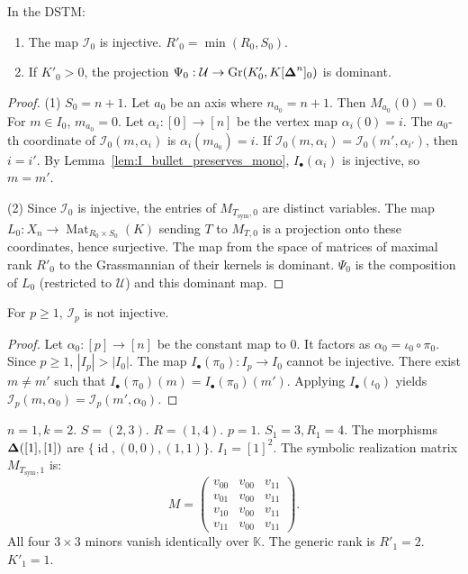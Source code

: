 \begin{theorem}[Injectivity and Dominance at $p=0$]\label{thm:index_collision_injectivity}
In the DSTM:
\begin{enumerate}
    \item The map $\mathcal{I}_0$ is injective. $R'_0 = \min(R_0, S_0)$.
    \item If $K'_0>0$, the projection
          $\Psi_0: \mathcal{U} \to \operatorname{Gr}(K'_0, K[\boldsymbol{\Delta}^n]_0)$ is dominant.
\end{enumerate}
\end{theorem}
\begin{proof}
(1) $S_0=n+1$. Let $a_0$ be an axis where $n_{a_0}=n+1$. Then $M_{a_0}(0)=0$.
For $m \in I_0$, $m_{a_0}=0$. Let $\alpha_i:[0]\to[n]$ be the vertex map
$\alpha_i(0)=i$. The $a_0$-th coordinate of $\mathcal{I}_0(m, \alpha_i)$ is
$\alpha_i(m_{a_0}) = i$. If
$\mathcal{I}_0(m, \alpha_i) = \mathcal{I}_0(m', \alpha_{i'})$, then
$i=i'$. By Lemma~\ref{lem:I_bullet_preserves_mono}, $I_\bullet(\alpha_i)$
is injective, so $m=m'$.

(2) Since $\mathcal{I}_0$ is injective, the entries of $M_{T_{\mathrm{sym}},0}$
are distinct variables. The map
$L_0: X_n \to \operatorname{Mat}_{R_0\times S_0}(K)$ sending $T$ to
$M_{T,0}$ is a projection onto these coordinates, hence surjective. The
map from the space of matrices of maximal rank $R'_0$ to the Grassmannian
of their kernels is dominant. $\Psi_0$ is the composition of $L_0$
(restricted to $\mathcal{U}$) and this dominant map.
\end{proof}

\begin{lemma}\label{lem:noninj-all-p>0}
For $p\ge 1$, $\mathcal{I}_p$ is not injective.
\end{lemma}
\begin{proof}
Let $\alpha_0:[p]\to[n]$ be the constant map to $0$. It factors as
$\alpha_0 = \iota_0 \circ \pi_0$. Since $p\ge 1$, $|I_p| > |I_0|$.
The map $I_\bullet(\pi_0): I_p \to I_0$ cannot be injective. There exist
$m \ne m'$ such that $I_\bullet(\pi_0)(m) = I_\bullet(\pi_0)(m')$.
Applying $I_\bullet(\iota_0)$ yields
$\mathcal{I}_p(m, \alpha_0) = \mathcal{I}_p(m', \alpha_0)$.
\end{proof}

\begin{example}\label{ex:rank_drop_22}
$n=1, k=2$. $S=(2, 3)$. $R=(1, 4)$.
$p=1$. $S_1=3, R_1=4$. The morphisms $\boldsymbol{\Delta}([1],[1])$ are
$\{\operatorname{id}, (0,0), (1,1)\}$. $I_1=[1]^2$. The symbolic realization
matrix $M_{T_{\mathrm{sym}},1}$ is:
\[
M = \begin{pmatrix}
v_{00} & v_{00} & v_{11} \\
v_{01} & v_{00} & v_{11} \\
v_{10} & v_{00} & v_{11} \\
v_{11} & v_{00} & v_{11}
\end{pmatrix}.
\]
All four $3\times 3$ minors vanish identically over $\mathbb{K}$. The
generic rank is $R'_1=2$. $K'_1=1$.
\end{example}

